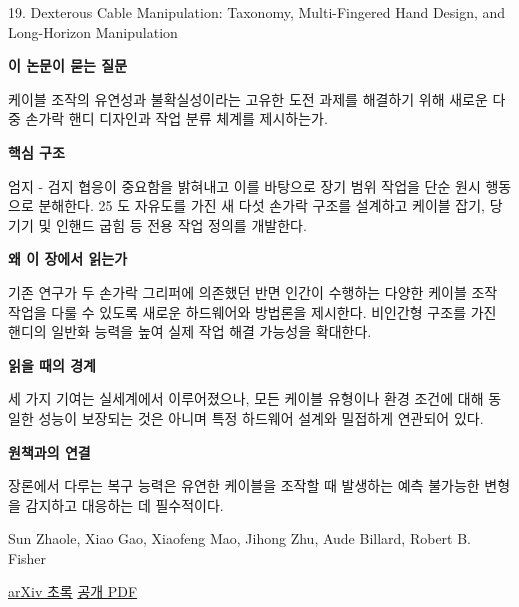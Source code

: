 \documentclass[11pt,openany]{book}
\begin{document}
\begin{termcard}{19. Dexterous Cable Manipulation: Taxonomy, Multi-Fingered Hand Design, and Long-Horizon Manipulation}

\par

\medskip

{\sffamily\bfseries\color{deepblue} 이 논문이 묻는 질문}\par

케이블 조작의 유연성과 불확실성이라는 고유한 도전 과제를 해결하기 위해 새로운 다중 손가락 핸디 디자인과 작업 분류 체계를 제시하는가.

\smallskip

{\sffamily\bfseries\color{deepblue} 핵심 구조}\par

엄지 - 검지 협응이 중요함을 밝혀내고 이를 바탕으로 장기 범위 작업을 단순 원시 행동으로 분해한다. 25 도 자유도를 가진 새 다섯 손가락 구조를 설계하고 케이블 잡기, 당기기 및 인핸드 굽힘 등 전용 작업 정의를 개발한다.

\smallskip

{\sffamily\bfseries\color{deepblue} 왜 이 장에서 읽는가}\par

기존 연구가 두 손가락 그리퍼에 의존했던 반면 인간이 수행하는 다양한 케이블 조작 작업을 다룰 수 있도록 새로운 하드웨어와 방법론을 제시한다. 비인간형 구조를 가진 핸디의 일반화 능력을 높여 실제 작업 해결 가능성을 확대한다.

\smallskip

{\sffamily\bfseries\color{coral} 읽을 때의 경계}\par

세 가지 기여는 실세계에서 이루어졌으나, 모든 케이블 유형이나 환경 조건에 대해 동일한 성능이 보장되는 것은 아니며 특정 하드웨어 설계와 밀접하게 연관되어 있다.

\smallskip

{\sffamily\bfseries\color{teal} 원책과의 연결}\par

장론에서 다루는 복구 능력은 유연한 케이블을 조작할 때 발생하는 예측 불가능한 변형을 감지하고 대응하는 데 필수적이다.

\medskip

{\footnotesize\color{muted} Sun Zhaole, Xiao Gao, Xiaofeng Mao, Jihong Zhu, Aude Billard, Robert B. Fisher\par

\href{https://arxiv.org/abs/2502.00396}{arXiv 초록} \quad \href{https://arxiv.org/pdf/2502.00396}{공개 PDF}\par}

\end{termcard}
\end{document}
